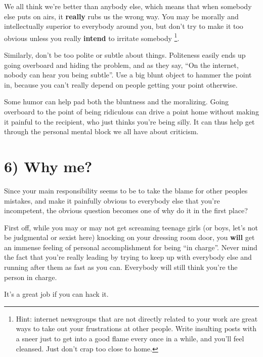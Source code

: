 \documentclass[a4paper,8pt,english]{sphinxmanual}
\begin{document}
We all think we're better than anybody else, which means that when
somebody else puts on airs, it \textbf{really} rubs us the wrong way.  You may
be morally and intellectually superior to everybody around you, but
don't try to make it too obvious unless you really \textbf{intend} to irritate
somebody \footnote[3]{
Hint: internet newsgroups that are not directly related to your work
are great ways to take out your frustrations at other people. Write
insulting posts with a sneer just to get into a good flame every once in
a while, and you'll feel cleansed. Just don't crap too close to home.
}.

Similarly, don't be too polite or subtle about things. Politeness easily
ends up going overboard and hiding the problem, and as they say, ``On the
internet, nobody can hear you being subtle''. Use a big blunt object to
hammer the point in, because you can't really depend on people getting
your point otherwise.

Some humor can help pad both the bluntness and the moralizing.  Going
overboard to the point of being ridiculous can drive a point home
without making it painful to the recipient, who just thinks you're being
silly.  It can thus help get through the personal mental block we all
have about criticism.


\section{6) Why me?}
\label{process/management-style:why-me}
Since your main responsibility seems to be to take the blame for other
peoples mistakes, and make it painfully obvious to everybody else that
you're incompetent, the obvious question becomes one of why do it in the
first place?

First off, while you may or may not get screaming teenage girls (or
boys, let's not be judgmental or sexist here) knocking on your dressing
room door, you \textbf{will} get an immense feeling of personal accomplishment
for being ``in charge''.  Never mind the fact that you're really leading
by trying to keep up with everybody else and running after them as fast
as you can.  Everybody will still think you're the person in charge.

It's a great job if you can hack it.
\end{document}
